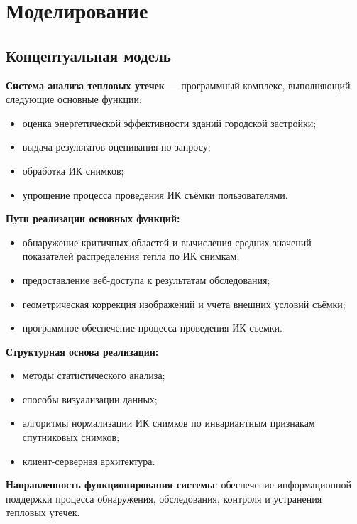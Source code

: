 \chapter{Моделирование}
\label{chap:models}

\section{Концептуальная модель}

\textbf{Система анализа тепловых утечек} --- программный комплекс, выполняющий следующие основные функции:

\begin{itemize}
	\item оценка энергетической эффективности зданий городской застройки;
	\item выдача результатов оценивания по запросу;
	\item обработка ИК снимков;
	\item упрощение процесса проведения ИК съёмки пользователями.
\end{itemize}

\textbf{Пути реализации основных функций:}

\begin{itemize}
	\item обнаружение критичных областей и вычисления средних значений показателей распределения тепла по ИК снимкам;
	\item предоставление веб-доступа к результатам обследования;
	\item геометрическая коррекция изображений и учета внешних условий съёмки;
	\item программное обеспечение процесса проведения ИК съемки.
\end{itemize}
 
\textbf{Структурная основа реализации:}

\begin{itemize}
	\item методы статистического анализа;
	\item способы визуализации данных;
	\item алгоритмы нормализации ИК снимков по инвариантным признакам спутниковых снимков;
	\item клиент-серверная архитектура.
\end{itemize}

\textbf{Направленность функционирования системы}: обеспечение информационной поддержки процесса обнаружения, обследования, контроля и устранения тепловых утечек.
 

